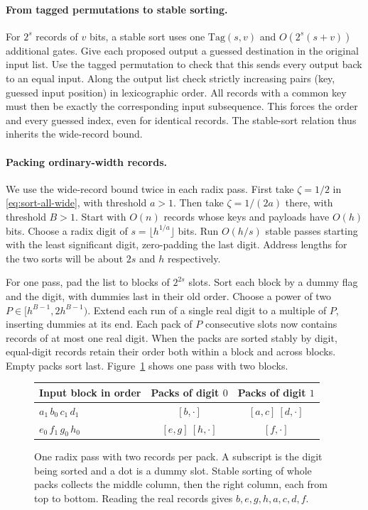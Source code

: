 \paragraph{From tagged permutations to stable sorting.}
For $2^s$ records of $v$ bits, a stable sort uses one
$\mathrm{Tag}(s,v)$ and $O(2^s(s+v))$ additional gates. Give each
proposed output a guessed destination in the original input list.
Use the tagged permutation to check that this sends every output back
to an equal input. Along the output list check strictly increasing
pairs (key, guessed input position) in lexicographic order. All records
with a common key must then be exactly the corresponding input
subsequence. This forces the order and every guessed index, even for
identical records. The stable-sort relation thus inherits the
wide-record bound.

\paragraph{Packing ordinary-width records.}
We use the wide-record bound twice in each radix pass.
First take $\zeta=1/2$ in \eqref{eq:sort-all-wide}, with threshold
$a>1$. Then take $\zeta=1/(2a)$ there, with threshold $B>1$.
Start with $O(n)$ records whose keys and payloads have $O(h)$ bits.
Choose a radix digit of
$s=\lfloor h^{1/a}\rfloor$ bits. Run $O(h/s)$ stable passes starting
with the least significant digit, zero-padding the last digit.
Address lengths for the two sorts will be about $2s$ and $h$
respectively.

For one pass, pad the list to blocks of $2^{2s}$ slots. Sort each
block by a dummy flag and the digit, with dummies last in their old order. Choose a power of two
$P\in[h^{B-1},2h^{B-1})$. Extend each run of a single real digit to
a multiple of $P$, inserting dummies at its end. Each pack of $P$
consecutive slots now contains records of at most one real digit.
When the packs are sorted stably by digit, equal-digit records retain
their order both within a block and across blocks. Empty packs sort
last. Figure~\ref{fig:sort-packs} shows one pass with two blocks.

\begin{figure}[!hbp]
\centering
\begin{tabular}{@{}l@{\qquad}c@{\qquad}c@{}}
\toprule
Input block in order & Packs of digit $0$ & Packs of digit $1$\\
\midrule
$a_1\, b_0\, c_1\, d_1$ & $[b,\cdot]$ & $[a,c]\ [d,\cdot]$\\
$e_0\, f_1\, g_0\, h_0$ & $[e,g]\ [h,\cdot]$ & $[f,\cdot]$\\
\bottomrule
\end{tabular}
\caption{One radix pass with two records per pack. A subscript is the
digit being sorted and a dot is a dummy slot. Stable sorting of whole
packs collects the middle column, then the right column, each from
top to bottom. Reading the real records gives $b,e,g,h,a,c,d,f$.}
\label{fig:sort-packs}
\end{figure}

